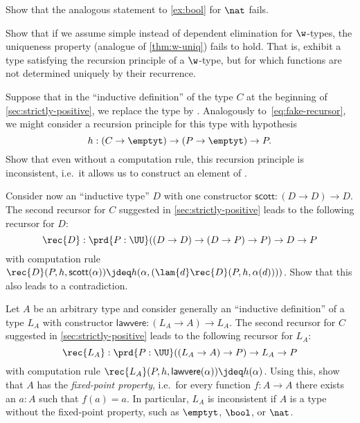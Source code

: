 \begin{ex}\label{ex:ind-nat-not-equiv}
  Show that the analogous statement to \autoref{ex:bool} for $\nat$ fails.
\end{ex}

\begin{ex}\label{ex:no-dep-uniqueness-failure}
  Show that if we assume simple instead of dependent elimination for $\w$-types, the uniqueness property (analogue of \autoref{thm:w-uniq}) fails to hold.
  That is, exhibit a type satisfying the recursion principle of a $\w$-type, but for which functions are not determined uniquely by their recurrence.
\end{ex}

\begin{ex}\label{ex:loop}
  Suppose that in the ``inductive definition'' of the type $C$ at the beginning of \autoref{sec:strictly-positive}, we replace the type \nat by \emptyt.
  Analogously to~\eqref{eq:fake-recursor}, we might consider a recursion principle for this type with hypothesis
  \[ h:(C\to\emptyt) \to (P\to\emptyt) \to P. \]
  Show that even without a computation rule, this recursion principle is inconsistent, i.e.\ it allows us to construct an element of \emptyt.
\end{ex}

\begin{ex}\label{ex:loop2}
  Consider now an ``inductive type'' $D$ with one constructor $\mathsf{scott}:(D\to D) \to D$.
  The second recursor for $C$ suggested in \autoref{sec:strictly-positive} leads to the following recursor for $D$:
  \[ \rec{D} : \prd{P:\UU} ((D\to D) \to (D\to P)\to P) \to D \to P \]
  with computation rule $\rec{D}(P,h,\mathsf{scott}(\alpha)) \jdeq h(\alpha,(\lam{d} \rec{D}(P,h,\alpha(d))))$.
  Show that this also leads to a contradiction.
\end{ex}

\begin{ex}\label{ex:inductive-lawvere}
  Let $A$ be an arbitrary type and consider generally an ``inductive definition'' of a type $L_A$ with constructor $\mathsf{lawvere}:(L_A\to A) \to L_A$.
  The second recursor for $C$ suggested in \autoref{sec:strictly-positive} leads to the following recursor for $L_A$:
  \[ \rec{L_A} : \prd{P:\UU} ((L_A\to A) \to P) \to L_A\to P \]
  with computation rule $\rec{L_A}(P,h,\mathsf{lawvere}(\alpha)) \jdeq h(\alpha)$.
  Using this, show that $A$ has the \emph{fixed-point property}, i.e.\ for every function $f:A\to A$ there exists an $a:A$ such that $f(a)=a$.
  In particular, $L_A$ is inconsistent if $A$ is a type without the fixed-point property, such as $\emptyt$, $\bool$, or $\nat$.
\end{ex}


